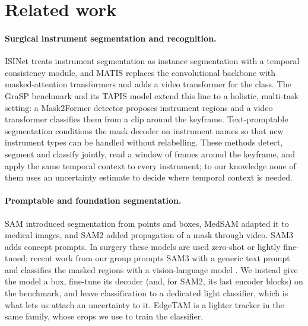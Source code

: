 \section{Related work}
\label{sec:related}

\paragraph{Surgical instrument segmentation and recognition.}
ISINet \citep{gonzalez2020isinet} treats instrument segmentation as instance segmentation with a temporal consistency module, and MATIS \citep{ayobi2023matis} replaces the convolutional backbone with masked-attention transformers and adds a video transformer for the class.
The GraSP benchmark and its TAPIS model \citep{ayobi2024pixel} extend this line to a holistic, multi-task setting: a Mask2Former detector \citep{cheng2022mask2former} proposes instrument regions and a video transformer classifies them from a clip around the keyframe.
Text-promptable segmentation \citep{zhou2023tpsis} conditions the mask decoder on instrument names so that new instrument types can be handled without relabelling.
These methods detect, segment and classify jointly, read a window of frames around the keyframe, and apply the same temporal context to every instrument; to our knowledge none of them uses an uncertainty estimate to decide where temporal context is needed.

\paragraph{Promptable and foundation segmentation.}
SAM \citep{kirillov2023sam} introduced segmentation from points and boxes, MedSAM \citep{ma2024medsam} adapted it to medical images, and SAM2 \citep{ravi2024sam2} added propagation of a mask through video.
SAM3 \citep{carion2025sam3} adds concept prompts.
In surgery these models are used zero-shot or lightly fine-tuned; recent work from our group prompts SAM3 with a generic text prompt and classifies the masked regions with a vision-language model \citep{poudel2026sam3}.
We instead give the model a box, fine-tune its decoder (and, for SAM2, its last encoder blocks) on the benchmark, and leave classification to a dedicated light classifier, which is what lets us attach an uncertainty to it.
EdgeTAM \citep{zhou2025edgetam} is a lighter tracker in the same family, whose crops we use to train the classifier.

